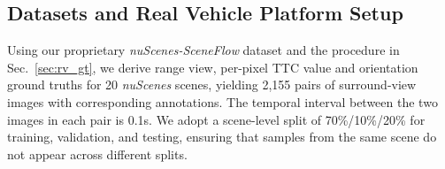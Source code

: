 \documentclass[journal]{IEEEtran}
\begin{document}

    
    


\subsection{Datasets and Real Vehicle Platform Setup}

Using our proprietary \textit{nuScenes-SceneFlow} dataset and the procedure in Sec.~\ref{sec:rv_gt}, we derive range view, per-pixel TTC value and orientation ground truths for 20 \textit{nuScenes} scenes, yielding 2{,}155 pairs of surround-view images with corresponding annotations. The temporal interval between the two images in each pair is 0.1s. We adopt a scene-level split of 70\%/10\%/20\% for training, validation, and testing, ensuring that samples from the same scene do not appear across different splits. 
\end{document}
